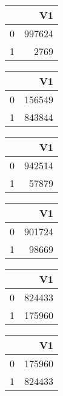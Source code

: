 \bigskip\bigskip
\centering
\begin{tabular}{rr}
  \hline
 & V1 \\ 
  \hline
0 & 997624 \\ 
  1 & 2769 \\ 
   \hline
\end{tabular}

\bigskip\bigskip
\centering
\begin{tabular}{rr}
  \hline
 & V1 \\ 
  \hline
0 & 156549 \\ 
  1 & 843844 \\ 
   \hline
\end{tabular}

\bigskip\bigskip
\centering
\begin{tabular}{rr}
  \hline
 & V1 \\ 
  \hline
0 & 942514 \\ 
  1 & 57879 \\ 
   \hline
\end{tabular}

\bigskip\bigskip
\centering
\begin{tabular}{rr}
  \hline
 & V1 \\ 
  \hline
0 & 901724 \\ 
  1 & 98669 \\ 
   \hline
\end{tabular}

\bigskip\bigskip
\centering
\begin{tabular}{rr}
  \hline
 & V1 \\ 
  \hline
0 & 824433 \\ 
  1 & 175960 \\ 
   \hline
\end{tabular}

\bigskip\bigskip
\centering
\begin{tabular}{rr}
  \hline
 & V1 \\ 
  \hline
0 & 175960 \\ 
  1 & 824433 \\ 
   \hline
\end{tabular}

